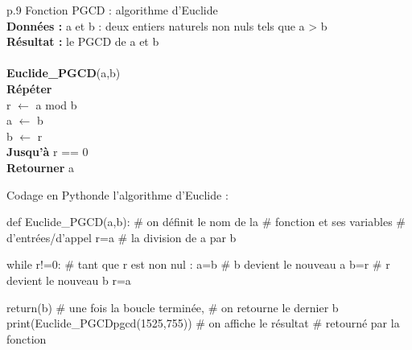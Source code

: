 \documentclass[10pt]{article}
\begin{document}
\begin{minipage}[c]{.48\linewidth}
\begin{pseudo}
\begin{tabular}{p{.9\textwidth}}
\hline
Fonction PGCD : algorithme d’Euclide \\
\hline
\textbf{Données :} a et b : deux entiers naturels non nuls tels que a > b \\
\textbf{Résultat :} le PGCD de a et b \\
\\
\textbf{Euclide\_PGCD}(a,b) \\
\hspace{.5cm}\textbf{Répéter}\\
\hspace{1cm}r $\leftarrow$ a mod b\\
\hspace{1cm}a $\leftarrow$ b \\
\hspace{1cm}b $\leftarrow$ r \\
\hspace{.5cm}\textbf{Jusqu’à} r == 0 \\
\hspace{.5cm}\textbf{Retourner} a\\
\hline
\end{tabular}
\end{pseudo}
\end{minipage} \hfill
\begin{minipage}[c]{.48\linewidth}
\begin{py}
Codage en Pythonde l'algorithme d'Euclide :
\begin{python}
def Euclide_PGCD(a,b):	# on définit le nom de la 
			# fonction et ses variables 
			# d'entrées/d'appel
    r=a%
			# la division de a par b
    
    while r!=0:		# tant que r est non nul :
        a=b		# b devient le nouveau a
        b=r		# r devient le nouveau b
        r=a%
        
    return(b)		# une fois la boucle terminée, 
			# on retourne le dernier b    
print(Euclide_PGCDpgcd(1525,755))	
			# on affiche le résultat 
			# retourné par la fonction
\end{python}
\end{py}
\end{minipage}
\end{document}
